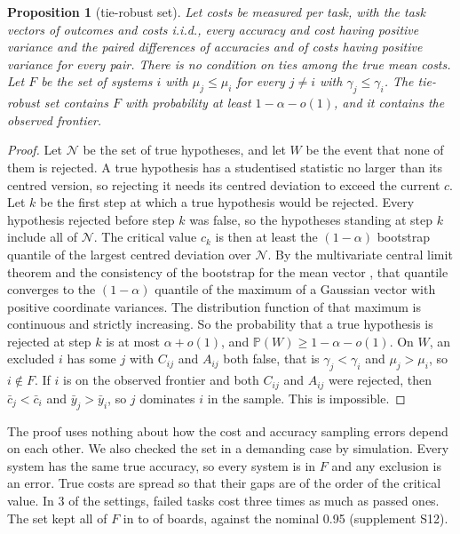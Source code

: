 \documentclass[11pt]{article}
\renewcommand{\Pr}{\mathbb{P}}
\newtheorem{proposition}{Proposition}
\begin{document}
\begin{proposition}[tie-robust set]
\label{prop:tierobust}
Let costs be measured per task, with the task vectors of outcomes and costs i.i.d., every accuracy and cost having positive variance and the paired differences of accuracies and of costs having positive variance for every pair. There is no condition on ties among the true mean costs. Let $F$ be the set of systems $i$ with $\mu_j\le\mu_i$ for every $j\ne i$ with $\gamma_j\le\gamma_i$. The tie-robust set contains $F$ with probability at least $1-\alpha-o(1)$, and it contains the observed frontier.
\end{proposition}
\begin{proof}
Let $\mathcal N$ be the set of true hypotheses, and let $W$ be the event that none of them is rejected. A true hypothesis has a studentised statistic no larger than its centred version, so rejecting it needs its centred deviation to exceed the current $c$. Let $k$ be the first step at which a true hypothesis would be rejected. Every hypothesis rejected before step $k$ was false, so the hypotheses standing at step $k$ include all of $\mathcal N$. The critical value $c_k$ is then at least the $(1-\alpha)$ bootstrap quantile of the largest centred deviation over $\mathcal N$. By the multivariate central limit theorem and the consistency of the bootstrap for the mean vector \citep{bickel1981bootstrap}, that quantile converges to the $(1-\alpha)$ quantile of the maximum of a Gaussian vector with positive coordinate variances. The distribution function of that maximum is continuous and strictly increasing. So the probability that a true hypothesis is rejected at step $k$ is at most $\alpha+o(1)$, and $\Pr(W)\ge1-\alpha-o(1)$. On $W$, an excluded $i$ has some $j$ with $C_{ij}$ and $A_{ij}$ both false, that is $\gamma_j<\gamma_i$ and $\mu_j>\mu_i$, so $i\notin F$. If $i$ is on the observed frontier and both $C_{ij}$ and $A_{ij}$ were rejected, then $\bar c_j<\bar c_i$ and $\bar y_j>\bar y_i$, so $j$ dominates $i$ in the sample. This is impossible.
\end{proof}
The proof uses nothing about how the cost and accuracy sampling errors depend on each other. We also checked the set in a demanding case by simulation. Every system has the same true accuracy, so every system is in $F$ and any exclusion is an error. True costs are spread so that their gaps are of the order of the critical value. In 3 of the \NumStressSettings{} settings, failed tasks cost three times as much as passed ones. The set kept all of $F$ in \NumStressSdMin{} to \NumStressSdMax{} of boards, against the nominal 0.95 (supplement S12).
\end{document}

